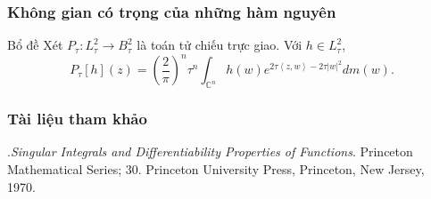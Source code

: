 \documentclass[11pt]{beamer}
\numberwithin{equation}{section}
\theoremstyle{plain}
\theoremstyle{definition}
\theoremstyle{remark}
\begin{document}
\begin{frame}\frametitle{Không gian có trọng của những hàm nguyên}
\begin{block}{Bổ đề}
Xét $P_{\tau}:L_{\tau}^2\to B_\tau^2$ là toán tử chiếu trực giao. Với $h\in 	L_{\tau}^2$,
\[{P_\tau }\left[ h \right]\left( z \right) = {\left( {\frac{2}{\pi }} \right)^n}{\tau ^n}\int_{{\mathbb{C}^n}} {h\left( w \right){e^{2\tau \left\langle {z,w} \right\rangle  - 2\tau {{\left| w \right|}^2}}}dm\left( w \right)} .\]
\end{block}
\end{frame}

\begin{frame}\frametitle{Tài liệu tham khảo}
\begin{thebibliography}{99}
.{\it Singular Integrals and Differentiability Properties of Functions}.  Princeton Mathematical Series; 30. Princeton University Press, Princeton, New Jersey, 1970.
\end{thebibliography}
\end{frame}
\end{document}
